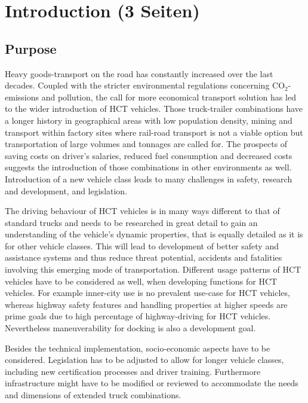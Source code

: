 \documentclass[ExampleMasters.tex]{subfiles}
\begin{document}
\clearpage
{\pagestyle{empty}\cleardoublepage}%
\chapter{Introduction (3 Seiten)}
\label{chap:introduction}

\section{Purpose}
\label{sec:purpose}
Heavy goods-transport on the road has constantly increased over the last decades. Coupled with the stricter environmental regulations concerning CO$_{2}$-emissions and pollution, the call for more economical transport solution has led to the wider introduction of \gls{HCT} vehicles. Those truck-trailer combinations have a longer history in geographical areas with low population density, mining and transport within factory sites where rail-road transport is not a viable option but transportation of large volumes and tonnages are called for. The prospects of saving costs on driver's salaries, reduced fuel consumption and decreased costs suggests the introduction of those combinations in other environments as well. Introduction of a new vehicle class leads to many challenges in safety, research and development, and legislation. 

The driving behaviour of \gls{HCT} vehicles is in many ways different to that of standard trucks and needs to be researched in great detail to gain an understanding of the vehicle's dynamic properties, that is equally detailed as it is for other vehicle classes. This will lead to development of better safety and assistance systems and thus reduce threat potential, accidents and fatalities involving this emerging mode of transportation. Different usage patterns of \gls{HCT} vehicles have to be considered as well, when developing functions for \gls{HCT} vehicles. For example inner-city use is no prevalent use-case for \gls{HCT} vehicles, whereas highway safety features and handling properties at higher speeds are prime goals due to high percentage of highway-driving for \gls{HCT} vehicles. Nevertheless maneuverability for docking is also a development goal.

Besides the technical implementation, socio-economic aspects have to be considered. Legislation has to be adjusted to allow for longer vehicle classes, including new certification processes and driver training. Furthermore infrastructure might have to be modified or reviewed to accommodate the needs and dimensions of extended truck combinations.
\end{document}
